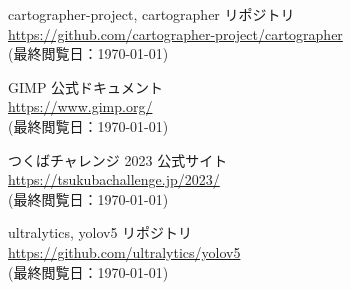 \documentclass[twocolumn, 9pt]{jsproceedings}
\begin{document}
\begin{thebibliography}{99}
cartographer-project, cartographer リポジトリ\\
\url{https://github.com/cartographer-project/cartographer}\\
(最終閲覧日：\today)

GIMP 公式ドキュメント\\
\url{https://www.gimp.org/}\\
(最終閲覧日：\today)

つくばチャレンジ 2023 公式サイト\\
\url{https://tsukubachallenge.jp/2023/}\\
(最終閲覧日：\today)

ultralytics, yolov5 リポジトリ\\
\url{https://github.com/ultralytics/yolov5}\\
(最終閲覧日：\today)



\end{thebibliography}
\normalsize
\end{document}

